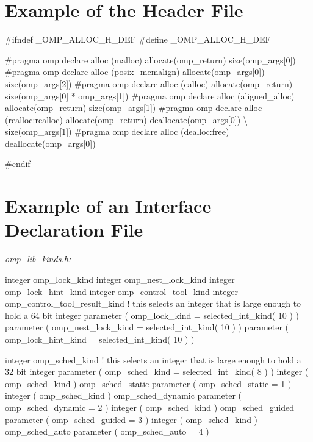 \section{Example of the  Header File}
\label{sec:Example of the omp_alloc.h Header File}
{\footnotesize \begin{codepar}
\#ifndef \_OMP\_ALLOC\_H\_DEF
\#define \_OMP\_ALLOC\_H\_DEF

\#pragma omp declare alloc (malloc) allocate(omp_return) size(omp_args[0])
\#pragma omp declare alloc (posix_memalign)  allocate(omp_args[0]) size(omp_args[2])
\#pragma omp declare alloc (calloc) allocate(omp_return) size(omp_args[0] * omp_args[1])
\#pragma omp declare alloc (aligned_alloc) allocate(omp_return) size(omp_args[1])
\#pragma omp declare alloc (realloc:realloc) allocate(omp_return) deallocate(omp_args[0]) \textbackslash
                                            size(omp_args[1]) 
\#pragma omp declare alloc (dealloc:free) deallocate(omp_args[0])

\#endif
\end{codepar}


\pagebreak
{\section{Example of an Interface Declaration  File}}
\label{sec:Example of an Interface Declaration include File}
\emph{omp\_lib\_kinds.h:}
{\small \begin{codepar}

     integer omp\_lock\_kind
     integer omp\_nest\_lock\_kind
     integer omp\_lock\_hint\_kind
     integer omp\_control\_tool\_kind
     integer omp\_control\_tool\_result\_kind
! this selects an integer that is large enough to hold a 64 bit integer
     parameter ( omp\_lock\_kind = selected\_int\_kind( 10 ) )
     parameter ( omp\_nest\_lock\_kind = selected\_int\_kind( 10 ) )
     parameter ( omp\_lock\_hint\_kind = selected\_int\_kind( 10 ) )
     
     integer omp\_sched\_kind
! this selects an integer that is large enough to hold a 32 bit integer
     parameter ( omp\_sched\_kind = selected\_int\_kind( 8 ) )
     integer ( omp\_sched\_kind ) omp\_sched\_static
     parameter ( omp\_sched\_static = 1 )
     integer ( omp\_sched\_kind ) omp\_sched\_dynamic
     parameter ( omp\_sched\_dynamic = 2 )
     integer ( omp\_sched\_kind ) omp\_sched\_guided
     parameter ( omp\_sched\_guided = 3 )
     integer ( omp\_sched\_kind ) omp\_sched\_auto
     parameter ( omp\_sched\_auto = 4 )
     

\end{codepar}}}
